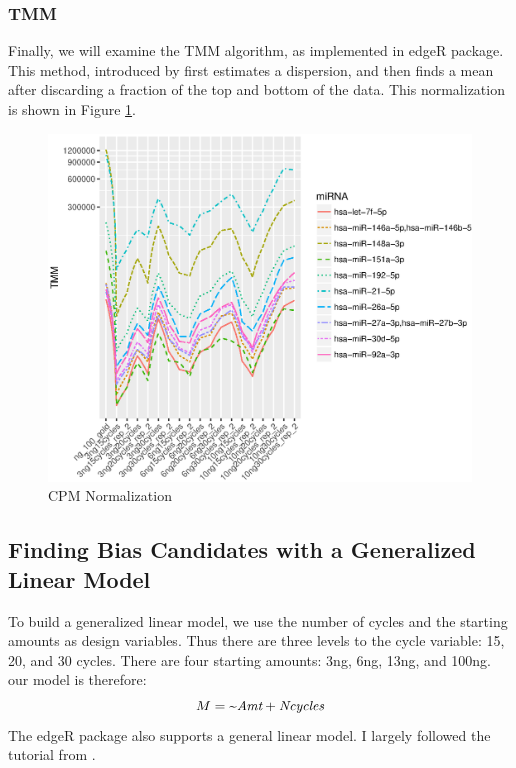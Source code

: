 \documentclass{bioinfo}
\begin{document}
\begin{methods}
\subsubsection{TMM}
Finally, we will examine the TMM algorithm, as implemented in edgeR \citep{McCarthy12}  package. This method, introduced by \citep{Robinson10} first estimates a dispersion, and then finds a mean after discarding a fraction of the top and bottom of the data. This normalization is shown in Figure \ref{fig:4}.
\begin{figure}[!tpb]
\centerline{\includegraphics[scale=0.5]{fig-4-tmm.eps}}
\caption{CPM Normalization}\label{fig:4}
\end{figure} 
\subsection{Finding Bias Candidates with a Generalized Linear Model}
To build a generalized linear model, we use the number of cycles and the starting amounts as design variables. Thus there are three levels to the cycle variable: 15, 20, and 30 cycles. There are four starting amounts: 3ng, 6ng, 13ng, and 100ng. 
our model is therefore: \\
\begin{equation}
M = \text{\textasciitilde}\text{\it{Amt}}+\text{\it{Ncycles}}\label{eq:01}
\end{equation}
The edgeR package also supports a general linear model. I largely followed the tutorial from \citep{Rueda15}.
\end{methods}
\end{document}
